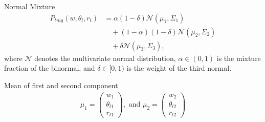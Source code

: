 \documentclass[10pt]{beamer}
\numberwithin{equation}{section}
\begin{document}
    \begin{frame}{Normal Mixture}
        \begin{align}
            \label{eq:normal_mix_pdf}
            P_{tmg}(w, \theta_l, r_t)
            &= \alpha (1-\delta) \mathcal{N}(\mu_1, \Sigma_1) \nonumber\\
            &\quad+ (1-\alpha) (1-\delta) \mathcal{N}(\mu_2, \Sigma_2) \nonumber\\
            &\quad+ \delta \mathcal{N}(\mu_3, \Sigma_3),
        \end{align}
        where $\mathcal{N}$ denotes the multivariate normal distribution,
        $\alpha \in (0,1)$ is the mixture fraction of the binormal,
        and $\delta \in [0,1)$ is the weight of the third normal.
    \end{frame}

    \begin{frame}{Mean of first and second component}
        \begin{align}
            \mu_1 =
            \begin{pmatrix}
                w_1         \\
                \theta_{l1} \\
                r_{t1}
            \end{pmatrix},
            \text{ and }
            \mu_2 =
            \begin{pmatrix}
                w_2         \\
                \theta_{l2} \\
                r_{t2}
            \end{pmatrix}
        \end{align}
    \end{frame}
\end{document}
